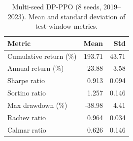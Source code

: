 \begin{table}[htbp]
\centering
\caption{Multi-seed DP-PPO (8 seeds, 2019--2023). Mean and standard deviation of test-window metrics.}
\label{tab:multiseed}
\begin{tabular}{lrr}
\toprule
\textbf{Metric} & \textbf{Mean} & \textbf{Std} \\
\midrule
Cumulative return (\%) & 193.71 & 43.71 \\
Annual return (\%) & 23.88 & 3.58 \\
Sharpe ratio & 0.913 & 0.094 \\
Sortino ratio & 1.257 & 0.146 \\
Max drawdown (\%) & -38.98 & 4.41 \\
Rachev ratio & 0.964 & 0.034 \\
Calmar ratio & 0.626 & 0.146 \\
\bottomrule
\end{tabular}
\end{table}
